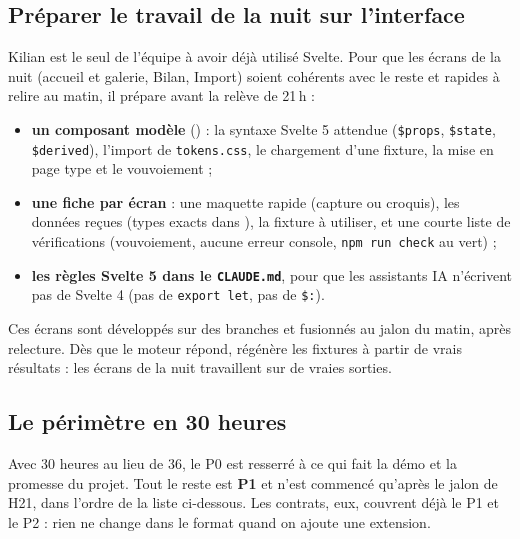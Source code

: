 \documentclass[11pt,a4paper]{article}
\newcommand{\pone}{\colorbox{ctMethod!18}{\footnotesize\textbf{P1}}}
\begin{document}
\subsection{Préparer le travail de la nuit sur l'interface}
Kilian est le seul de l'équipe à avoir déjà utilisé Svelte. Pour que les écrans de la nuit (accueil et galerie, Bilan, Import) soient cohérents avec le reste et rapides à relire au matin, il prépare avant la relève de 21\,h :
\begin{itemize}[leftmargin=*, nosep]
  \item \textbf{un composant modèle} () : la syntaxe Svelte 5 attendue (\texttt{\$props}, \texttt{\$state}, \texttt{\$derived}), l'import de \texttt{tokens.css}, le chargement d'une fixture, la mise en page type et le vouvoiement ;
  \item \textbf{une fiche par écran} : une maquette rapide (capture ou croquis), les données reçues (types exacts dans ), la fixture à utiliser, et une courte liste de vérifications (vouvoiement, aucune erreur console, \texttt{npm run check} au vert) ;
  \item \textbf{les règles Svelte 5 dans le \texttt{CLAUDE.md}}, pour que les assistants IA n'écrivent pas de Svelte 4 (pas de \texttt{export let}, pas de \texttt{\$:}).
\end{itemize}
Ces écrans sont développés sur des branches et fusionnés au jalon du matin, après relecture. Dès que le moteur répond,  régénère les fixtures à partir de vrais résultats : les écrans de la nuit travaillent sur de vraies sorties.

\subsection{Le périmètre en 30 heures}\label{sec:perimetre}
Avec 30 heures au lieu de 36, le P0 est resserré à ce qui fait la démo et la promesse du projet. Tout le reste est \pone{} et n'est commencé qu'après le jalon de H21, dans l'ordre de la liste ci-dessous. Les contrats, eux, couvrent déjà le P1 et le P2 : rien ne change dans le format quand on ajoute une extension.
\end{document}
